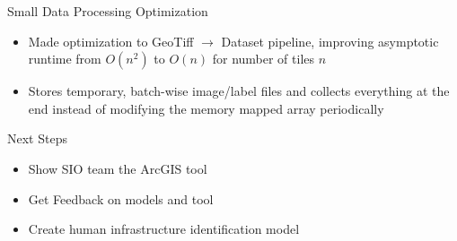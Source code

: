 \begin{frame}{Small Data Processing Optimization}
    \begin{itemize}
        \item Made optimization to GeoTiff $\rightarrow$ Dataset pipeline, improving asymptotic runtime from $O(n^2)$ to $O(n)$ for number of tiles $n$
        \item Stores temporary, batch-wise image/label files and collects everything at the end instead of modifying the memory mapped array periodically
    \end{itemize}
\end{frame}

\begin{frame}{Next Steps}
    \begin{itemize}
        \item Show SIO team the ArcGIS tool
        \item Get Feedback on models and tool
        \item Create human infrastructure identification model
    \end{itemize}
\end{frame}